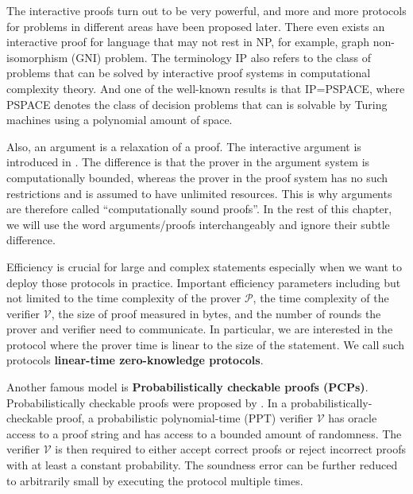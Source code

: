 The interactive proofs turn out to be very powerful, and more and more protocols for problems in different areas have been proposed later. There even exists an interactive proof for language that may not rest in NP, for example, graph non-isomorphism (GNI) problem.
The terminology IP also refers to the class of problems that can be solved by interactive proof systems in computational complexity theory. And one of the well-known results is that IP=PSPACE, where PSPACE denotes the class of decision problems that can is solvable by Turing machines using a polynomial amount of space.

Also, an argument is a relaxation of a proof. The interactive argument is introduced in \cite{10.1145/22145.22178}.
The difference is that the prover in the argument system is computationally bounded, whereas the prover in the proof system has no such restrictions and is assumed to have unlimited resources. This is why arguments are therefore called ``computationally sound proofs''. In the rest of this chapter, we will use the word arguments/proofs interchangeably and ignore their subtle difference.



Efficiency is crucial for large and complex statements especially when we want to deploy those protocols in practice. Important efficiency parameters including but not limited to the time complexity of the prover $\mathcal{P}$, the time complexity of the verifier $\mathcal{V}$, the size of proof measured in bytes, and the number of rounds the prover and verifier need to communicate. In particular, we are interested in the protocol where the prover time is linear to the size of the statement. We call such protocols \textbf{linear-time zero-knowledge protocols}.


Another famous model is \textbf{Probabilistically checkable proofs (PCPs)}. Probabilistically checkable proofs were proposed by \cite{DBLP:journals/tcs/FortnowRS94} \cite{DBLP:conf/stoc/BabaiFLS91}. In a probabilistically-checkable proof, a probabilistic polynomial-time (PPT) verifier $\mathcal{V}$ has oracle access to a proof string and has access to a bounded amount of randomness. The verifier $\mathcal{V}$ is then required to either accept correct proofs or reject incorrect proofs with at least a constant probability. The soundness error can be further reduced to arbitrarily small by executing the protocol multiple times.

